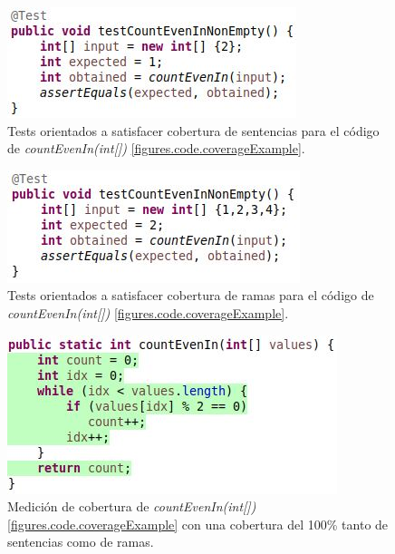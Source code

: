 \begin{figure}
	\includegraphics[width=\linewidth]{figures/stmtCoverageOrientedTests.JPG}
	\caption{Tests orientados a satisfacer cobertura de sentencias para el c\'odigo de \emph{countEvenIn(int[])} \ref{figures.code.coverageExample}.}
	\label{figures.examples.coverage.stmtTests}
\end{figure}

\begin{figure}
	\includegraphics[width=\linewidth]{figures/branchCoverageOrientedTests.JPG}
	\caption{Tests orientados a satisfacer cobertura de ramas para el c\'odigo de \emph{countEvenIn(int[])} \ref{figures.code.coverageExample}.}
	\label{figures.examples.coverage.branchTests}
\end{figure}

\begin{figure}
	\includegraphics[width=\linewidth]{figures/branchCoverageExampleComplete.JPG}
	\caption{Medici\'on de cobertura de \emph{countEvenIn(int[])} \ref{figures.code.coverageExample} con una cobertura del 100\% tanto de sentencias como de ramas.}
	\label{figures.examples.coverage.fullCoverage}
\end{figure}

